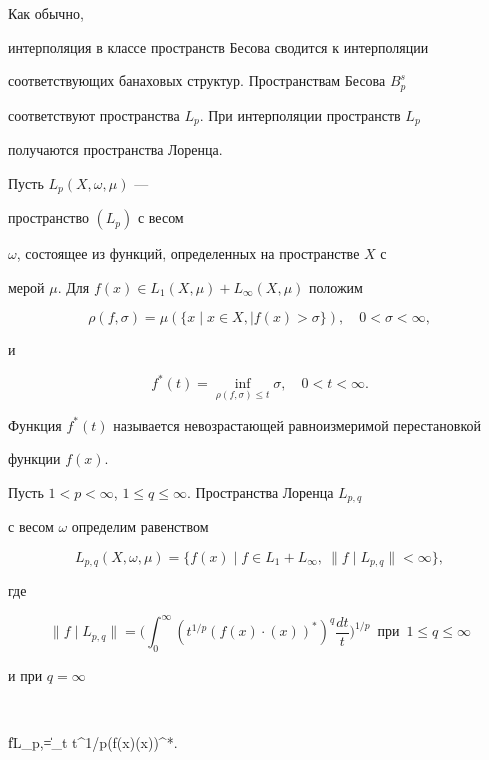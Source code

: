 Как обычно,


интерполяция в классе пространств Бесова сводится к интерполяции


соответствующих банаховых структур. Пространствам Бесова $B^s_p$


соответствуют пространства $L_p$. При интерполяции пространств $L_p$


получаются пространства Лоренца.





Пусть $L_p(X,\omega,\mu)$ ---


пространство $(L_p)$ с весом


$\omega$, состоящее из функций, определенных на пространстве $X$ с


мерой $\mu$. Для $f(x)\in L_1(X,\mu)+L_\infty(X,\mu)$ положим


$$


\rho(f,\sigma)=\mu(\{x\mid x\in X,\mid f(x)>\sigma\}),\quad


0<\sigma<\infty,


$$


и


$$


f^*(t)=\inf_{\rho(f,\sigma)\le t}\sigma,\quad 0<t<\infty.


$$


Функция $f^*(t)$ называется невозрастающей равноизмеримой перестановкой


функции $f(x)$.





Пусть $1<p<\infty$, $1\le q\le\infty$. Пространства Лоренца $L_{p,q}$


с весом $\omega$ определим равенством


$$


L_{p,q}(X,\omega,\mu)=\{f(x)\mid f\in L_1+L_\infty,


\ \|f\mid L_{p,q}\|<\infty\},


$$


где


$$


\|f\mid L_{p,q}\|=\bigg(\int^\infty_0 (t^{1/p}(f(x)\cdot(x))^*)^q


\frac{d t}{t}\bigg)^{1/p}\ \; \text{при}\ \; 1\le q\le\infty


$$


и при $q=\infty$


$$


\|f\mid L_p,\infty\|=\sup_t t^{1/p}(f(x)\cdot\omega(x))^*.


